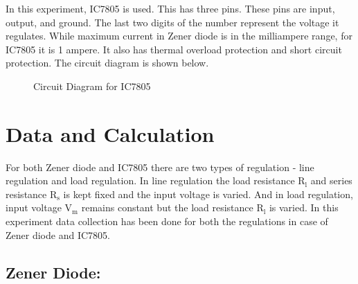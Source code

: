 \documentclass[12pt]{article}
\begin{document}
In this experiment, IC7805 is used. This has three pins. These pins are input, output, and ground. The last two digits of the number represent the voltage it regulates. While maximum current in Zener diode is in the milliampere range, for IC7805 it is 1 ampere. It also has thermal overload protection and short circuit protection. The circuit diagram is shown below.

\begin{figure}[!ht]
    \centering
    \caption{Circuit Diagram for IC7805}
    
    \label{fig:my_label}
    \end{figure}
\section{Data and Calculation}
For both Zener diode and IC7805 there are two types of regulation - line regulation and load regulation. In line regulation the load resistance $\mathrm{R_l}$ and series resistance $\mathrm{R_s}$ is kept fixed and the input voltage is varied. And in load regulation, input voltage $\mathrm{V_m}$ remains constant but the load resistance $\mathrm{R_l}$ is varied. In this experiment data collection has been done for both the regulations in case of Zener diode and IC7805.

\subsection{Zener Diode:}
\end{document}
